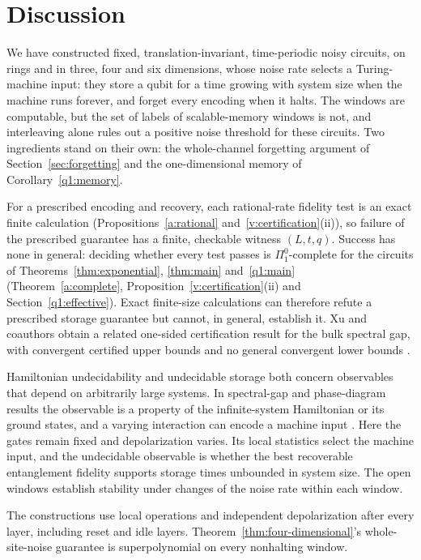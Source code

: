 \section{Discussion}\label{a:discussion}
We have constructed fixed, translation-invariant, time-periodic noisy circuits, on rings and in three, four and six dimensions, whose noise rate selects a Turing-machine input: they store a qubit for a time growing with system size when the machine runs forever, and forget every encoding when it halts. The windows are computable, but the set of labels of scalable-memory windows is not, and interleaving alone rules out a positive noise threshold for these circuits. Two ingredients stand on their own: the whole-channel forgetting argument of Section~\ref{sec:forgetting} and the one-dimensional memory of Corollary~\ref{q1:memory}.

For a prescribed encoding and recovery, each rational-rate fidelity test is an exact finite calculation (Propositions~\ref{a:rational} and~\ref{v:certification}(ii)), so failure of the prescribed guarantee has a finite, checkable witness \((L,t,q)\). Success has none in general: deciding whether every test passes is \(\Pi^0_1\)-complete for the circuits of Theorems~\ref{thm:exponential}, \ref{thm:main} and~\ref{q1:main} (Theorem~\ref{a:complete}, Proposition~\ref{v:certification}(ii) and Section~\ref{q1:effective}). Exact finite-size calculations can therefore refute a prescribed storage guarantee but cannot, in general, establish it. Xu and coauthors obtain a related one-sided certification result for the bulk spectral gap, with convergent certified upper bounds and no general convergent lower bounds \cite{XuEtAl2026}.

Hamiltonian undecidability and undecidable storage both concern observables that depend on arbitrarily large systems. In spectral-gap and phase-diagram results the observable is a property of the infinite-system Hamiltonian or its ground states, and a varying interaction can encode a machine input \cite{BCW2021,CPGW2015}. Here the gates remain fixed and depolarization varies. Its local statistics select the machine input, and the undecidable observable is whether the best recoverable entanglement fidelity supports storage times unbounded in system size. The open windows establish stability under changes of the noise rate within each window.

The constructions use local operations and independent depolarization after every layer, including reset and idle layers. Theorem~\ref{thm:four-dimensional}'s whole-site-noise guarantee is superpolynomial on every
nonhalting window.

